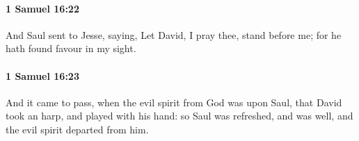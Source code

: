 		\paragraph{1 Samuel 16:22} %
			\label{1SAMUEL-16-22}

			And Saul sent to Jesse, saying, Let David, I pray thee, stand before me; for he hath found favour in my sight.


		\paragraph{1 Samuel 16:23} %
			\label{1SAMUEL-16-23}

			And it came to pass, when the evil spirit from God was upon Saul, that David took an harp, and played with his hand: so Saul was refreshed, and was well, and the evil spirit departed from him.

			
